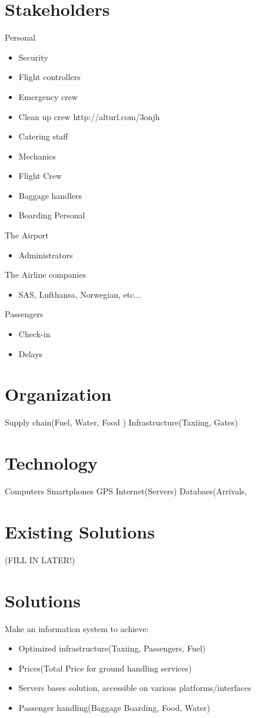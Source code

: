 \section{Stakeholders} 
\label{Stakeholders}

Personal
\begin{itemize}
\item Security
\item Flight controllers
\item Emergency crew
\item Clean up crew http://alturl.com/3onjh
\item Catering staff
\item Mechanics
\item Flight Crew
\item Baggage handlers
\item Boarding Personal
\end{itemize}

The Airport
\begin{itemize}
\item Administrators
\end{itemize}

The Airline companies
\begin{itemize}
\item SAS, Lufthansa, Norwegian, etc...
\end{itemize}

Passengers
\begin{itemize}
\item Check-in
\item Delays
\end{itemize}
	
\section{Organization}
\label{Organization}
Supply chain(Fuel, Water, Food )	
Infrastructure(Taxiing, Gates)
	
\section{Technology}
\label{Technology}
Computers
Smartphones
GPS
Internet(Servers)
Databaes(Arrivals, 

\section{Existing Solutions}
\label{Existing Solutions}
(FILL IN LATER!)

\section{Solutions}
\label{Solutons}
Make an information system to achieve:
\begin{itemize}
\item Optimized infrastructure(Taxiing, Passengers, Fuel)
\item Prices(Total Price for ground handling services)
\item Servers bases solution, accessible on various platforms/interfaces
\item Passenger handling(Baggage Boarding, Food, Water)
\end{itemize}